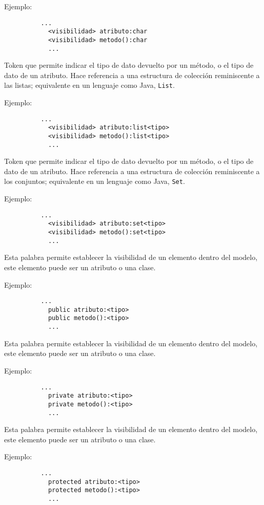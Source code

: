 \begin{description}[align=right,labelwidth=2.5cm]
	Ejemplo:
		\begin{lstlisting}
		  ...
			<visibilidad> atributo:char
			<visibilidad> metodo():char
			...
		\end{lstlisting}

\item [list] Token que permite indicar el tipo de dato devuelto por un método, o
	el tipo de dato de un atributo. Hace referencia a una
	estructura de colección reminiscente a las listas; equivalente en un lenguaje
	como Java, \texttt{List}.

	Ejemplo:
		\begin{lstlisting}
		  ...
			<visibilidad> atributo:list<tipo>
			<visibilidad> metodo():list<tipo>
			...
		\end{lstlisting}

\item[set] Token que permite indicar el tipo de dato devuelto por un método, o
	el tipo de dato de un atributo. Hace referencia a una
	estructura de colección reminiscente a los conjuntos; equivalente en un lenguaje
	como Java, \texttt{Set}.

	Ejemplo:
		\begin{lstlisting}
		  ...
			<visibilidad> atributo:set<tipo>
			<visibilidad> metodo():set<tipo>
			...
		\end{lstlisting}

\item [public] Esta palabra permite establecer la visibilidad de un elemento
	dentro del modelo, este elemento puede ser un atributo o una clase.

	Ejemplo:
		\begin{lstlisting}
		  ...
			public atributo:<tipo>
			public metodo():<tipo>
			...
		\end{lstlisting}

\item [private] Esta palabra permite establecer la visibilidad de un elemento
	dentro del modelo, este elemento puede ser un atributo o una clase.

	Ejemplo:
		\begin{lstlisting}
		  ...
			private atributo:<tipo>
			private metodo():<tipo>
			...
		\end{lstlisting}

\item [protected] Esta palabra permite establecer la visibilidad de un elemento
	dentro del modelo, este elemento puede ser un atributo o una clase.

	Ejemplo:
		\begin{lstlisting}
		  ...
			protected atributo:<tipo>
			protected metodo():<tipo>
			...
		\end{lstlisting}


\end{description}
